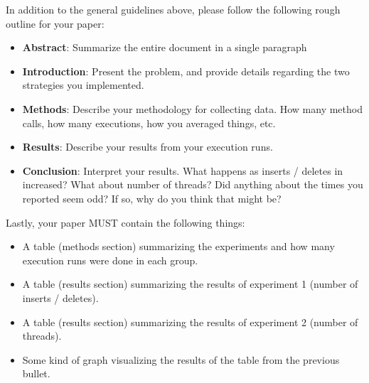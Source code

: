 \documentclass[paper=a4, fontsize=11pt, parskip=full]{scrartcl} %
\numberwithin{equation}{section} %
\numberwithin{figure}{section} %
\numberwithin{table}{section} %
\begin{document}
In addition to the general guidelines above, please follow the following rough outline for your paper:

\begin{itemize}
	\item \textbf{Abstract}: Summarize the entire document in a single paragraph
	\item \textbf{Introduction}: Present the problem, and provide details regarding the two strategies you implemented.
	\item \textbf{Methods}: Describe your methodology for collecting data. How many method calls, how many executions, how you averaged things, etc.
	\item \textbf{Results}: Describe your results from your execution runs.
	\item \textbf{Conclusion}: Interpret your results. What happens as inserts / deletes in increased? What about number of threads? Did anything about the times you reported seem odd? If so, why do you think that might be?
\end{itemize}

Lastly, your paper MUST contain the following things:

\begin{itemize}
	\item A table (methods section) summarizing the experiments and how many execution runs were done in each group.
	\item A table (results section) summarizing the results of experiment 1 (number of inserts / deletes).
	\item A table (results section) summarizing the results of experiment 2 (number of threads).
	\item Some kind of graph visualizing the results of the table from the previous bullet.
\end{itemize}


\end{document}
